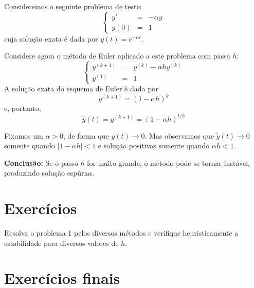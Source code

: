 Consideremos o seguinte problema de teste:
$$\left\{\begin{array}{rcl}y'&=&-\alpha y\\y(0)&=&1\end{array}\right.$$
cuja solução exata é dada por $y(t)=e^{-\alpha t}$.

Considere agora o método de Euler aplicado a este problema com passa $h$:
$$\left\{\begin{array}{rcl}y^{(k+1)}&=&y^{(k)}-\alpha h y^{(k)}\\y^{(1)}&=&1\end{array}\right.$$
A solução exata do esquema de Euler é dada por
$$y^{(k+1)}=(1-\alpha h)^{k}$$
e, portanto,
$$\tilde{y}(t)=y^{(k+1)}=(1-\alpha h)^{t/h}$$

Fixamos um $\alpha>0$, de forma que $y(t)\to 0$. Mas observamos que $\tilde{y}(t)\to 0$ somente quando $|1-\alpha h|<1$ e solução positivas somente quando $\alpha h<1$.

{\bf Conclusão:} Se o passo $h$ for muito grande, o método pode se tornar instável, produzindo solução espúrias.

\section*{Exercícios}

\begin{Exercise} Resolva o problema 1 pelos diversos métodos e verifique heuristicamente a estabilidade para diversos valores de $h$.
\end{Exercise}

\section*{Exercícios finais}

